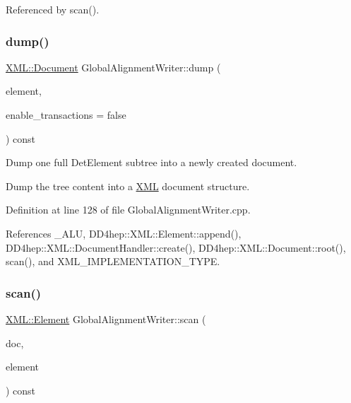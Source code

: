 Referenced by scan().

\hypertarget{class_d_d4hep_1_1_alignments_1_1_global_alignment_writer_a27eb3fbd7ac13d4190a3b24b7071c10c}{}\label{class_d_d4hep_1_1_alignments_1_1_global_alignment_writer_a27eb3fbd7ac13d4190a3b24b7071c10c} 
\subsubsection{\texorpdfstring{dump()}{dump()}}
{\footnotesize\ttfamily \hyperlink{class_d_d4hep_1_1_x_m_l_1_1_document}{X\+M\+L\+::\+Document} Global\+Alignment\+Writer\+::dump (\begin{DoxyParamCaption}\item[{\hyperlink{class_d_d4hep_1_1_geometry_1_1_det_element}{Det\+Element}}]{element,  }\item[{bool}]{enable\+\_\+transactions = {\ttfamily false} }\end{DoxyParamCaption}) const}



Dump one full Det\+Element subtree into a newly created document. 

Dump the tree content into a \hyperlink{namespace_d_d4hep_1_1_x_m_l}{X\+ML} document structure. 

Definition at line 128 of file Global\+Alignment\+Writer.\+cpp.



References \+\_\+\+A\+LU, D\+D4hep\+::\+X\+M\+L\+::\+Element\+::append(), D\+D4hep\+::\+X\+M\+L\+::\+Document\+Handler\+::create(), D\+D4hep\+::\+X\+M\+L\+::\+Document\+::root(), scan(), and X\+M\+L\+\_\+\+I\+M\+P\+L\+E\+M\+E\+N\+T\+A\+T\+I\+O\+N\+\_\+\+T\+Y\+PE.

\hypertarget{class_d_d4hep_1_1_alignments_1_1_global_alignment_writer_a4b4a9fab094b77d01d0d50ae0960ec8f}{}\label{class_d_d4hep_1_1_alignments_1_1_global_alignment_writer_a4b4a9fab094b77d01d0d50ae0960ec8f} 
\subsubsection{\texorpdfstring{scan()}{scan()}}
{\footnotesize\ttfamily \hyperlink{class_d_d4hep_1_1_x_m_l_1_1_element}{X\+M\+L\+::\+Element} Global\+Alignment\+Writer\+::scan (\begin{DoxyParamCaption}\item[{\hyperlink{class_d_d4hep_1_1_x_m_l_1_1_document}{X\+M\+L\+::\+Document}}]{doc,  }\item[{\hyperlink{class_d_d4hep_1_1_geometry_1_1_det_element}{Det\+Element}}]{element }\end{DoxyParamCaption}) const}



